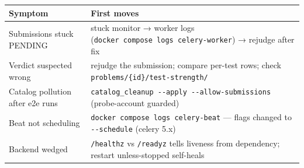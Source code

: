 \documentclass[
]{article}
\newcounter{none} %
\begin{document}
{\def\LTcaptype{none} %
\begin{longtable}[]{@{}ll@{}}
\toprule\noalign{}
Symptom & First moves \\
\midrule\noalign{}
\endhead
\bottomrule\noalign{}
\endlastfoot
Submissions stuck PENDING & stuck monitor → worker logs
(\texttt{docker\ compose\ logs\ celery-worker}) → rejudge after fix \\
Verdict suspected wrong & rejudge the submission; compare per-test rows;
check \texttt{problems/\{id\}/test-strength/} \\
Catalog pollution after e2e runs &
\texttt{catalog\_cleanup\ -\/-apply\ -\/-allow-submissions}
(probe-account guarded) \\
Beat not scheduling & \texttt{docker\ compose\ logs\ celery-beat} ---
flags changed to \texttt{-\/-schedule} (celery 5.x) \\
Backend wedged & \texttt{/healthz} vs \texttt{/readyz} tells liveness
from dependency; restart unless-stopped self-heals \\
\end{longtable}
}
\end{document}
